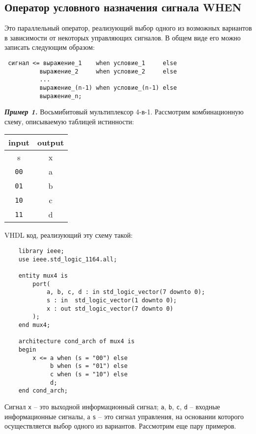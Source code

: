 \subsection{Оператор условного назначения сигнала WHEN}
Это параллельный оператор, реализующий выбор одного из возможных вариантов в зависимости от некоторых управляющих сигналов. В общем виде его можно записать следующим образом:
\begin{Code}
\begin{lstlisting}
 сигнал <= выражение_1    when условие_1     else 
          выражение_2     when условие_2     else 
          ...
          выражение_(n-1) when условие_(n-1) else 
          выражение_n;
\end{lstlisting}
\end{Code}
\textbf{\textit{Пример 1.}} Восьмибитовый мультиплексор 4-в-1.
Рассмотрим комбинационную схему, описываемую таблицей истинности:

{
\centering
\begin{tabular}{|c|c|}
\hline
input       & output \\ \hline
s           & x      \\ \hline
\texttt{00} & a      \\
\texttt{01} & b      \\
\texttt{10} & c      \\
\texttt{11} & d      \\
\hline
\end{tabular}\par
}

VHDL код, реализующий эту схему такой:
\begin{Code}
    \centering
    \begin{lstlisting}
    library ieee;
    use ieee.std_logic_1164.all;

    entity mux4 is
        port(
            a, b, c, d : in std_logic_vector(7 downto 0);
            s : in  std_logic_vector(1 downto 0);
            x : out std_logic_vector(7 downto 0)
        );
    end mux4;

    architecture cond_arch of mux4 is
    begin
        x <= a when (s = "00") else
             b when (s = "01") else
             c when (s = "10") else
             d;
    end cond_arch;
    \end{lstlisting}
\end{Code}

Сигнал \lstinline?x? – это выходной информационный сигнал; \lstinline?a?, \lstinline?b?, \lstinline?c?, \lstinline?d? – входные информационные сигналы, а \lstinline?s? – это сигнал управления, на основании которого осуществляется выбор одного из вариантов. 
Рассмотрим еще пару примеров.



